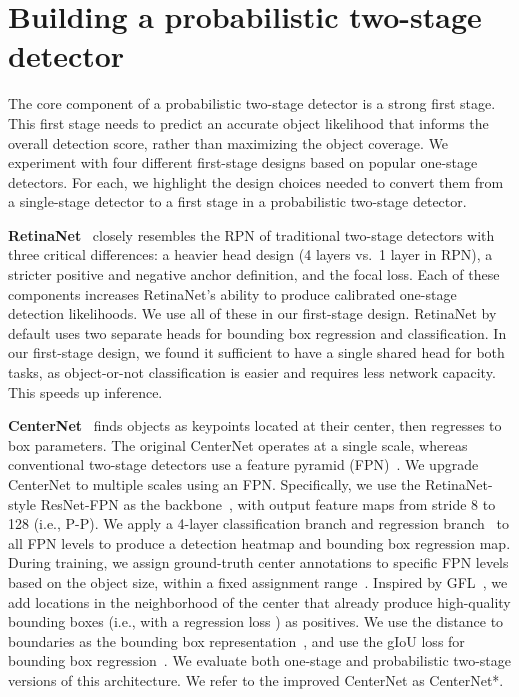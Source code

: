 \documentclass{article}
\newcommand{\lblsec}[1]{\label{sec:#1}}
\begin{document}
\section{Building a probabilistic two-stage detector}
\lblsec{designing}

The core component of a probabilistic two-stage detector is a strong first stage.
This first stage needs to predict an accurate object likelihood that informs the overall detection score, rather than maximizing the object coverage.
We experiment with four different first-stage designs based on popular one-stage detectors.
For each, we highlight the design choices needed to convert them from a single-stage detector to a first stage in a probabilistic two-stage detector.

\textbf{RetinaNet}~\cite{lin2018focal} closely resembles the RPN of traditional two-stage detectors with three critical differences: a heavier head design (4 layers vs.\ 1 layer in RPN), a stricter positive and negative anchor definition, and the focal loss.
Each of these components increases RetinaNet's ability to produce calibrated one-stage detection likelihoods.
We use all of these in our first-stage design.
RetinaNet by default uses two separate heads for bounding box regression and classification.
In our first-stage design, we found it sufficient to have a single shared head for both tasks, as object-or-not classification is easier and requires less network capacity.
This speeds up inference.

\textbf{CenterNet}~\cite{zhou2019objects} finds objects as keypoints located at their center, then regresses to box parameters.
The original CenterNet operates at a single scale,
whereas conventional two-stage detectors use a feature pyramid (FPN)~\cite{lin2017feature}.
We upgrade CenterNet to multiple scales using an FPN.
Specifically, we use the RetinaNet-style ResNet-FPN as the backbone~\cite{lin2018focal}, with output feature maps from stride 8 to 128 (i.e., P-P). 
We apply a 4-layer classification branch and regression branch~\cite{tian2019fcos} to all FPN levels to produce a detection heatmap and bounding box regression map.
During training, we assign ground-truth center annotations to specific FPN levels based on the object size, within a fixed assignment range~\cite{tian2019fcos}. 
Inspired by GFL~\cite{li2020generalized}, we add locations in the  neighborhood of the center that already produce high-quality bounding boxes (i.e., with a regression loss ) as positives.
We use the distance to boundaries as the bounding box representation~\cite{tian2019fcos}, and use the gIoU loss for bounding box regression~\cite{rezatofighi2019generalized}.
We evaluate both one-stage and probabilistic two-stage versions of this architecture.
We refer to the improved CenterNet as CenterNet*.
\end{document}
